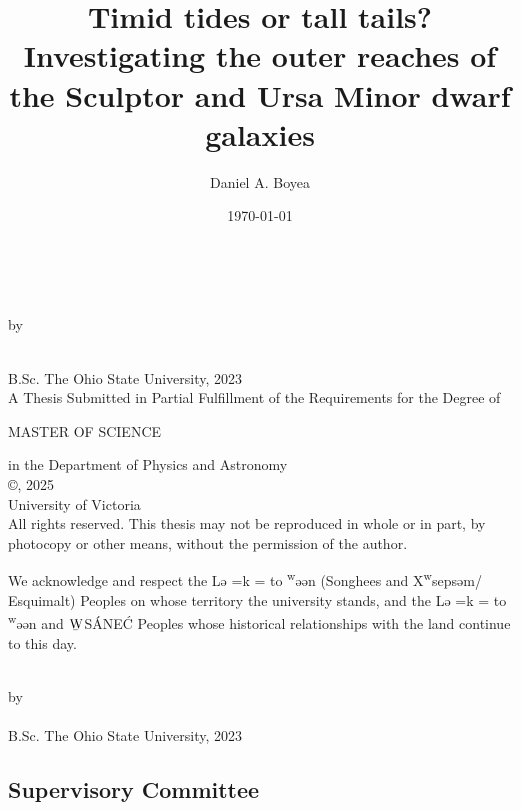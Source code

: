 \documentclass[12pt,oneside,letterpaper]{report}
\title{Timid tides or tall tails? \\
    Investigating the outer reaches of the Sculptor and Ursa Minor dwarf galaxies
}
\author{Daniel A. Boyea}
\date{\today}
\newcommand{\schwa}{ə}
\newcommand{\Lekwnen}{L\schwa{}\overcomma{k}\textsuperscript{w}\schwa{}\ng{}\schwa{}n}
\newcommand{\skipline}{\vspace{\baselineskip}}
\def\overcomma#1{%
  \setbox0=\hbox{#1}%
  \dimen0=\wd0       %
  \vbox{%
    \hbox to \dimen0{\hfil,\hfil}%
    \nointerlineskip            %
    \box0                       %
  }%
}
\begin{document}
\pagestyle{plain}


\makeatletter
\begin{titlepage}
   \begin{center}
       \textbf{\large \@title}\\
        \skipline

        by\\
        \skipline

       \@author\\
       B.Sc. The Ohio State University, 2023\\
       \vspace*{3\baselineskip}
    A Thesis Submitted in Partial Fulfillment of the Requirements for the Degree of\\
    \skipline

    MASTER OF SCIENCE \\
    \skipline

    in the Department of Physics and Astronomy\\
       \vfill
       {\small
       ©\@author, 2025\\
       University of Victoria\\
   }
   \skipline
       {\small
       All rights reserved. This thesis may not be reproduced in whole or in part,
   by photocopy or other means, without the permission of the author.} \\
\skipline
   \end{center}
We acknowledge and respect the \Lekwnen{} (Songhees and X\textsuperscript{w}seps\schwa{}m/
Esquimalt) Peoples on whose territory the university stands, and the
\Lekwnen{} and ${\underaccent{\bar}{\rm W}}$S\'ANE\'C Peoples whose historical relationships with the
land continue to this day. 
\end{titlepage}

\addtocounter{page}{1}


\begin{centering}
\textbf{\@title}\\
\skipline
by\\
\skipline
\@author\\
B.Sc. The Ohio State University, 2023\\
\vspace*{3\baselineskip}
\end{centering}

\subsection*{Supervisory Committee}
\skipline
\end{document}
